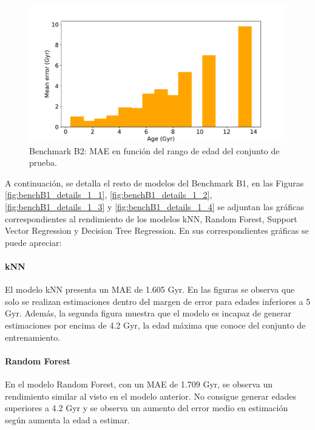 \begin{figure}[H]
\begin{center}
 \includegraphics[width=0.8\linewidth]{Figuras/Experimentos/B_B2_bayes_3.pdf}
\end{center}
\caption{Benchmark B2: MAE en función del rango de edad del conjunto de prueba.}
 \label{fig:benchB2_best_3}
\end{figure}

A continuación, se detalla el resto de modelos del Benchmark B1, en las Figuras \ref{fig:benchB1_details_1_1}, \ref{fig:benchB1_details_1_2}, \ref{fig:benchB1_details_1_3} y \ref{fig:benchB1_details_1_4} se adjuntan las gráficas correspondientes al rendimiento de los modelos kNN, Random Forest, Support Vector Regression y Decision Tree Regression. En sus correspondientes gráficas se puede apreciar:

\paragraph{kNN} 
El modelo kNN presenta un MAE de 1.605 Gyr. En las figuras se observa que solo se realizan estimaciones dentro del margen de error para edades inferiores a 5 Gyr. Además, la segunda figura muestra que el modelo es incapaz de generar estimaciones por encima de 4.2 Gyr, la edad máxima que conoce del conjunto de entrenamiento.  %

\paragraph{Random Forest} 
En el modelo Random Forest, con un MAE de 1.709 Gyr, se observa un rendimiento similar al visto en el modelo anterior. No consigue generar edades superiores a 4.2 Gyr y se observa un aumento del error medio en estimación según aumenta la edad a estimar. %

